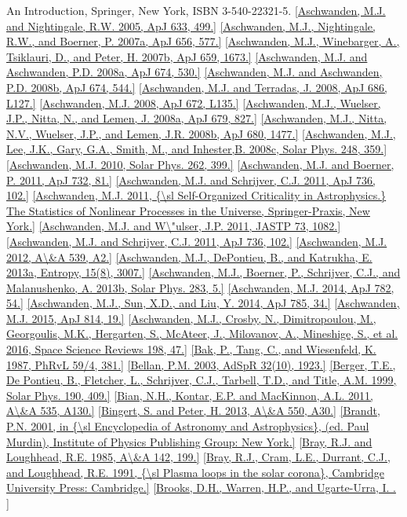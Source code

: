 \documentclass[10pt,preprint]{aastex}  %
\begin{document}
\begin{references}
{{	An Introduction}, Springer, New York, ISBN 3-540-22321-5.}
\ref{Aschwanden, M.J. and Nightingale, R.W. 2005, ApJ 633, 499.}
\ref{Aschwanden, M.J., Nightingale, R.W., and Boerner, P. 2007a, ApJ 656, 577.}
\ref{Aschwanden, M.J., Winebarger, A., Tsiklauri, D., and Peter, H.
	2007b, ApJ 659, 1673.}
\ref{Aschwanden, M.J. and Aschwanden, P.D. 2008a, ApJ 674, 530.}
\ref{Aschwanden, M.J. and Aschwanden, P.D. 2008b, ApJ 674, 544.}
\ref{Aschwanden, M.J. and Terradas, J. 2008, ApJ 686, L127.}
\ref{Aschwanden, M.J. 2008, ApJ 672, L135.}
\ref{Aschwanden, M.J., Wuelser, J.P., Nitta, N., and Lemen, J.
 	2008a, ApJ 679, 827.}
\ref{Aschwanden, M.J., Nitta, N.V., Wuelser, J.P., and Lemen, J.R.
 	2008b, ApJ 680, 1477.}
\ref{Aschwanden, M.J., Lee, J.K., Gary, G.A., Smith, M., and Inhester,B.
 	2008c, Solar Phys. 248, 359.}
\ref{Aschwanden, M.J.  2010, Solar Phys. 262, 399.}
\ref{Aschwanden, M.J. and Boerner, P. 2011, ApJ 732, 81.}
\ref{Aschwanden, M.J. and Schrijver, C.J. 2011, ApJ 736, 102.}
\ref{Aschwanden, M.J. 2011, {\sl Self-Organized Criticality in 
	Astrophysics.} The Statistics of Nonlinear Processes in 
	the Universe, Springer-Praxis, New York.}
\ref{Aschwanden, M.J. and W\"ulser, J.P. 2011, JASTP 73, 1082.}
\ref{Aschwanden, M.J. and Schrijver, C.J. 2011, ApJ 736, 102.}
\ref{Aschwanden, M.J. 2012, A\&A 539, A2.}
\ref{Aschwanden, M.J., DePontieu, B., and Katrukha, E.
 	2013a, Entropy, 15(8), 3007.}
\ref{Aschwanden, M.J., Boerner, P., Schrijver, C.J., and Malanushenko, A.
 	2013b, Solar Phys. 283, 5.}
\ref{Aschwanden, M.J. 2014, ApJ 782, 54.}
\ref{Aschwanden, M.J., Sun, X.D., and Liu, Y. 2014, ApJ 785, 34.}
\ref{Aschwanden, M.J. 2015, ApJ 814, 19.}
\ref{Aschwanden, M.J., Crosby, N., Dimitropoulou, M., Georgoulis, M.K., 
	Hergarten, S., McAteer, J., Milovanov, A., Mineshige, S., et al.
 	2016, Space Science Reviews 198, 47.}
\ref{Bak, P., Tang, C., and Wiesenfeld, K. 1987, PhRvL 59/4, 381.}
\ref{Bellan, P.M. 2003, AdSpR 32(10), 1923.}
\ref{Berger, T.E., De Pontieu, B., Fletcher, L., Schrijver, C.J., 
	Tarbell, T.D., and Title, A.M. 1999, Solar Phys. 190, 409.}
\ref{Bian, N.H., Kontar, E.P. and MacKinnon, A.L. 2011, A\&A 535, A130.}
\ref{Bingert, S. and Peter, H. 2013, A\&A 550, A30.}
\ref{Brandt, P.N. 2001, in {\sl Encyclopedia of Astronomy and Astrophysics},
	(ed. Paul Murdin), Institute of Physics Publishing Group: New York.} 
\ref{Bray, R.J. and Loughhead, R.E. 1985, A\&A 142, 199.}
\ref{Bray, R.J., Cram, L.E., Durrant, C.J., and Loughhead, R.E.
	1991, {\sl Plasma loops in the solar corona}, Cambridge
	University Press: Cambridge.}
\ref{Brooks, D.H., Warren, H.P., and Ugarte-Urra, I. .
}
\end{references}
\end{document}
